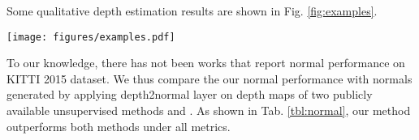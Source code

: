 Some qualitative depth estimation results are shown in Fig. \ref{fig:examples}.

\begin{figure*}
\centering
\texttt{[image: figures/examples.pdf]}
\caption{Visual comparison of depth estimation between \protect\cite{eigen2014depth} (supervised with depth ground truth), \protect\cite{zhou2017unsupervised} (unsupervised) and ours (unsupervised). As the original depth ground truth map comes from sparse laser measurement, the interpolated depth map is shown for better visualization.}
\label{fig:examples}
\end{figure*}

To our knowledge, there has not been works that report normal performance on KITTI 2015 dataset. We thus compare the our normal performance with normals generated by applying depth2normal layer on depth maps of two publicly available unsupervised methods \cite{zhou2017unsupervised} and \cite{godard2016unsupervised}. As shown in Tab. \ref{tbl:normal}, our method outperforms both methods under all metrics.
